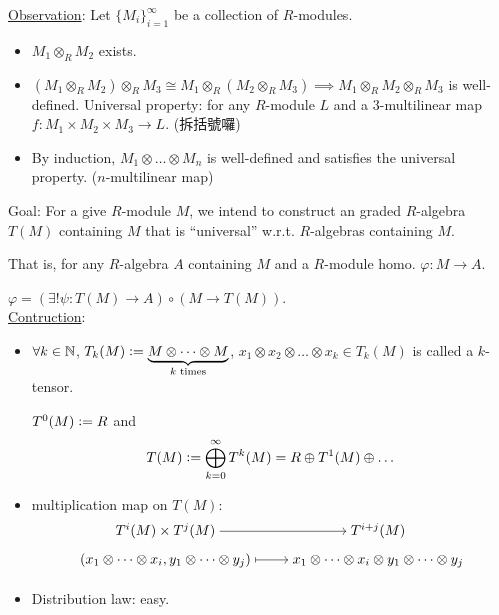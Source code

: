 \underline{Observation}:
Let $\{ M_i \}_{i=1}^\infty$ be a collection of $R$-modules.
\begin{itemize}
  \item $M_1 \otimes_R M_2$ exists.
  \item $(M_1 \otimes_R M_2) \otimes_R M_3 \cong
    M_1 \otimes_R (M_2 \otimes_R M_3) \implies
    M_1 \otimes_R M_2 \otimes_R M_3$ is well-defined.
    Universal property: for any $R$-module $L$ and a $3$-multilinear map
    $f: M_1 \times M_2 \times M_3 \to L$. (拆括號囉)
  \item By induction, $M_1 \otimes \dots \otimes M_n$ is well-defined and
    satisfies the universal property. ($n$-multilinear map)
\end{itemize}

Goal: For a give $R$-module $M$, we intend to construct an graded $R$-algebra
$T(M)$ containing $M$ that is ``universal'' w.r.t. $R$-algebras containing $M$.

That is, for any $R$-algebra $A$ containing $M$ and a $R$-module homo.
$\varphi: M \to A$.

$\varphi = (\exists! \psi: T(M) \to A) \circ (M \to T(M))$. \\[.5em]
\underline{Contruction}:
\begin{itemize}
  \item $\forall k \in \mathbb{N}$, $T_k(M) \vcentcolon=
    \underbrace{M\otimes \dots \otimes M}_{k \text{~times}}$,
    $x_1\otimes x_2\otimes \dots \otimes x_k \in T_k(M)$ is called a $k$-tensor.

    $T^0(M) \vcentcolon= R$ and
    \[
      T(M) \vcentcolon= \bigoplus_{k=0}^\infty T^k(M) = R \oplus T^1(M) \oplus \dots
    \]
  \item multiplication map on $T(M)$:
    \[
      \begin{tikzcd}[cramped, row sep=tiny]
        T^i(M) \times T^j(M) \arrow[r] & T^{i+j}(M) \\
        (x_1\otimes \dots \otimes x_i, y_1\otimes \dots \otimes y_j)
        \arrow[r, mapsto]
        & x_1\otimes \dots \otimes x_i\otimes y_1\otimes \dots\otimes y_j \\
      \end{tikzcd}
    \]
  \item Distribution law: easy.
\end{itemize}

